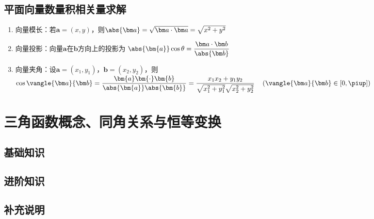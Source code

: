   \subsection{平面向量数量积相关量求解}
    \begin{enumerate}[label=\arabic*)]
      \item 向量模长：若$\bm a=(x,y)$，则$\abs{\bm a}=\sqrt{\bm a\cdot\bm a}=\sqrt{x^2+y^2}$
      \item 向量投影：向量$\bm a$在$\bm b$方向上的投影为
        $\abs{\bm{a}}\cos\theta=\dfrac{\bm a\cdot\bm b}{\abs{\bm b}}$
      \item 向量夹角：设$\bm a=(x_1,y_1)$，$\bm b=(x_2,y_2)$，则
        $\cos\vangle{\bm a}{\bm b}=\dfrac{\bm{a}\bm{\cdot}\bm{b}}{\abs{\bm{a}}\abs{\bm{b}}}=\dfrac{x_1x_2+y_1y_2}{\sqrt{x_1^2+y_1^2}\sqrt{x_2^2+y_2^2}} \quad \left(\vangle{\bm a}{\bm b}\in\left[0,\piup\right]\right)$
    \end{enumerate}
\section{三角函数概念、同角关系与恒等变换}
  \subsection{基础知识}
    \subsection{}
  \subsection{进阶知识}
  \subsection{补充说明}
